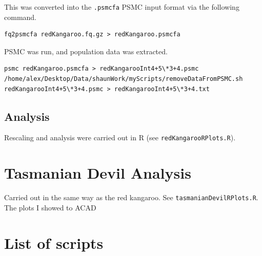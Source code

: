\documentclass[11pt,a4paper]{article}
\begin{document}
This was converted into the \verb|.psmcfa| PSMC input format via the following command.
\begin{lstlisting}
fq2psmcfa redKangaroo.fq.gz > redKangaroo.psmcfa
\end{lstlisting}
PSMC was run, and population data was extracted.
\begin{lstlisting}
psmc redKangaroo.psmcfa > redKangarooInt4+5\*3+4.psmc
/home/alex/Desktop/Data/shaunWork/myScripts/removeDataFromPSMC.sh redKangarooInt4+5\*3+4.psmc > redKangarooInt4+5\*3+4.txt
\end{lstlisting}
\subsection{Analysis}
Rescaling and analysis were carried out in R (see \verb|redKangarooRPlots.R|).

\section{Tasmanian Devil Analysis}
Carried out in the same way as the red kangaroo. See \verb|tasmanianDevilRPlots.R|. The plots I showed to ACAD 


{}
\newpage

\appendix
\section{List of scripts}
\end{document}
